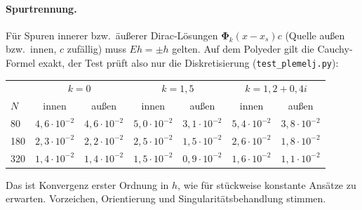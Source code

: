 \documentclass[11pt, a4paper]{article}
\newcommand{\mvec}[1]{\boldsymbol{#1}}
\begin{document}
\paragraph{Spurtrennung.} Für Spuren innerer bzw.\ äußerer Dirac-Lösungen
$\mvec\Phi_k(x-x_s)c$ (Quelle außen bzw.\ innen, $c$ zufällig) muss $Eh=\pm h$ gelten.
Auf dem Polyeder gilt die Cauchy-Formel exakt, der Test prüft also nur die
Diskretisierung (\texttt{test\_plemelj.py}):
\begin{center}\small
\begin{tabular}{lcccccc}
\toprule
& \multicolumn{2}{c}{$k=0$} & \multicolumn{2}{c}{$k=1{,}5$} & \multicolumn{2}{c}{$k=1{,}2+0{,}4i$}\\
$N$ & innen & außen & innen & außen & innen & außen\\
\midrule
80 & $4{,}6\cdot10^{-2}$ & $4{,}6\cdot10^{-2}$ & $5{,}0\cdot10^{-2}$ & $3{,}1\cdot10^{-2}$ & $5{,}4\cdot10^{-2}$ & $3{,}8\cdot10^{-2}$\\
180 & $2{,}3\cdot10^{-2}$ & $2{,}2\cdot10^{-2}$ & $2{,}5\cdot10^{-2}$ & $1{,}5\cdot10^{-2}$ & $2{,}6\cdot10^{-2}$ & $1{,}8\cdot10^{-2}$\\
320 & $1{,}4\cdot10^{-2}$ & $1{,}4\cdot10^{-2}$ & $1{,}5\cdot10^{-2}$ & $0{,}9\cdot10^{-2}$ & $1{,}6\cdot10^{-2}$ & $1{,}1\cdot10^{-2}$\\
\bottomrule
\end{tabular}
\end{center}
Das ist Konvergenz erster Ordnung in $h$, wie für stückweise konstante Ansätze zu
erwarten. Vorzeichen, Orientierung und Singularitätsbehandlung stimmen.
\end{document}
